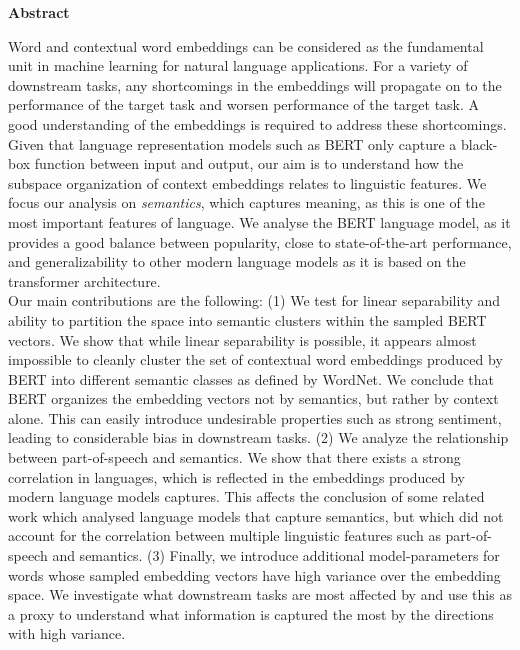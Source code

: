 \newpage
{\Huge \bf Abstract}
\vspace{24pt} 


Word and contextual word embeddings can be considered as the fundamental unit in machine learning for natural language applications.
For a variety of downstream tasks, any shortcomings in the embeddings will propagate on to the performance of the target task and worsen performance of the target task.
A good understanding of the embeddings is required to address these shortcomings.
Given that language representation models such as BERT only capture a black-box function between input and output, our aim is to understand how the subspace organization of context embeddings relates to linguistic features.
We focus our analysis on \textit{semantics}, which captures meaning, as this is one of the most important features of language. 
We analyse the BERT language model, as it provides a good balance between popularity, close to state-of-the-art performance, and generalizability to other modern language models as it is based on the transformer architecture.
\\

Our main contributions are the following: (1) We test for linear separability and ability to partition the space into semantic clusters within the sampled BERT vectors.
We show that while linear separability is possible, it appears almost impossible to cleanly cluster the set of contextual word embeddings produced by BERT into different semantic classes as defined by WordNet.
We conclude that BERT organizes the embedding vectors not by semantics, but rather by context alone.
This can easily introduce undesirable properties such as strong sentiment, leading to considerable bias in downstream tasks.
(2) We analyze the relationship between part-of-speech and semantics. 
We show that there exists a strong correlation in languages, which is reflected in the embeddings produced by modern language models captures.
This affects the conclusion of some related work which analysed language models that capture semantics, but which did not account for the correlation between multiple linguistic features such as part-of-speech and semantics.
(3) Finally, we introduce additional model-parameters for words whose sampled embedding vectors have high variance over the embedding space.
We investigate what downstream tasks are most affected by and use this as a proxy to understand what information is captured the most by the directions with high variance. \\

\newpage
\vspace*{\fill}
